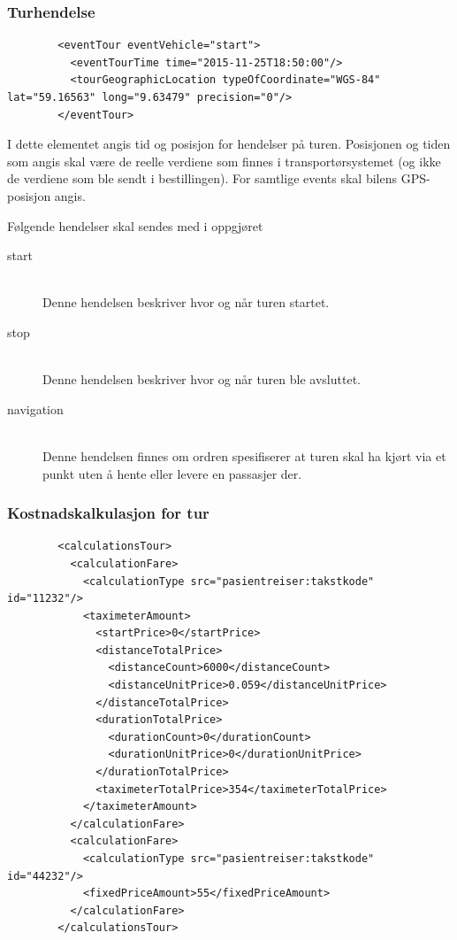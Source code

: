 \documentclass[a4paper,titlepage,norsk,11pt]{article}
\begin{document}
\subsubsection{Turhendelse}

\begin{lstlisting}
        <eventTour eventVehicle="start">
          <eventTourTime time="2015-11-25T18:50:00"/>
          <tourGeographicLocation typeOfCoordinate="WGS-84" lat="59.16563" long="9.63479" precision="0"/>
        </eventTour>
\end{lstlisting}

I dette elementet angis tid og posisjon for hendelser på turen. Posisjonen og tiden som angis skal være de reelle verdiene som finnes i transportørsystemet (og ikke de verdiene som ble sendt i bestillingen). For samtlige events skal bilens GPS-posisjon angis.

Følgende hendelser skal sendes med i oppgjøret

\begin{description}

  \item[start] \hfill \\
  Denne hendelsen beskriver hvor og når turen startet.

  \item[stop] \hfill \\
  Denne hendelsen beskriver hvor og når turen ble avsluttet.

	\item[navigation] \hfill \\
	Denne hendelsen finnes om ordren spesifiserer at turen skal ha kjørt via et punkt uten å hente eller levere en passasjer der.

\end{description}

\subsubsection{Kostnadskalkulasjon for tur}

\begin{lstlisting}
        <calculationsTour>
          <calculationFare>
            <calculationType src="pasientreiser:takstkode" id="11232"/>
            <taximeterAmount>
              <startPrice>0</startPrice>
              <distanceTotalPrice>
                <distanceCount>6000</distanceCount>
                <distanceUnitPrice>0.059</distanceUnitPrice>
              </distanceTotalPrice>
              <durationTotalPrice>
                <durationCount>0</durationCount>
                <durationUnitPrice>0</durationUnitPrice>
              </durationTotalPrice>
              <taximeterTotalPrice>354</taximeterTotalPrice>
            </taximeterAmount>
          </calculationFare>
          <calculationFare>
            <calculationType src="pasientreiser:takstkode" id="44232"/>
            <fixedPriceAmount>55</fixedPriceAmount>
          </calculationFare>
        </calculationsTour>
\end{lstlisting}
\end{document}
